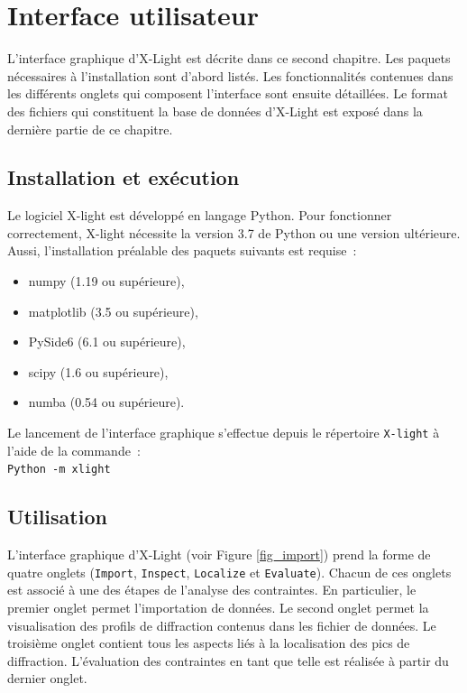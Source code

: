 \documentclass[french,a4paper]{report}
\begin{document}
\chapter{Interface utilisateur}

L'interface graphique d'X-Light est décrite dans ce second chapitre. Les paquets nécessaires à l'installation sont d'abord listés. Les fonctionnalités contenues dans les différents onglets qui composent l'interface sont ensuite détaillées. Le format des fichiers qui constituent la base de données d'X-Light est exposé dans la dernière partie de ce chapitre.


\section{Installation et exécution}

Le logiciel X-light est développé en langage Python. Pour fonctionner correctement, X-light nécessite la version 3.7 de Python ou une version ultérieure. Aussi, l'installation préalable des paquets suivants est requise~:
\begin{itemize}
\item{numpy (1.19 ou supérieure),}
\item{matplotlib (3.5 ou supérieure),}
\item{PySide6 (6.1 ou supérieure),}
\item{scipy (1.6 ou supérieure),}
\item{numba (0.54 ou supérieure).}
\end{itemize}
Le lancement de l'interface graphique s'effectue depuis le répertoire \texttt{X-light} à l'aide de la commande~:\\
\texttt{Python -m xlight}

\section{Utilisation}

L'interface graphique d'X-Light (voir Figure \ref{fig_import}) prend la forme de quatre onglets (\texttt{Import}, \texttt{Inspect}, \texttt{Localize} et \texttt{Evaluate}). Chacun de ces onglets est associé à une des étapes de l'analyse des contraintes. En particulier, le premier onglet permet l'importation de données. Le second onglet permet la visualisation des profils de diffraction contenus dans les fichier de données. Le troisième onglet contient tous les aspects liés à la localisation des pics de diffraction. L'évaluation des contraintes en tant que telle est réalisée à partir du dernier onglet.
\end{document}
